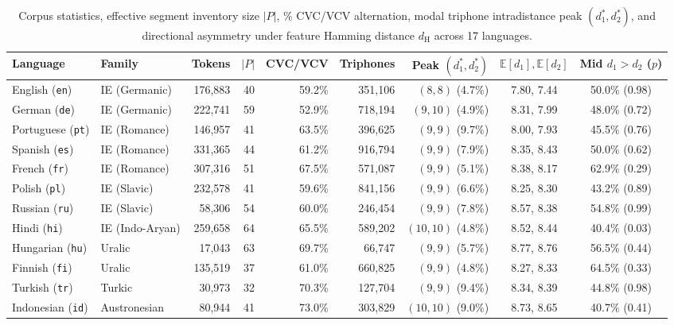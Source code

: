 \documentclass[11pt,a4paper,leqno]{article}
\begin{document}
\begin{table}[htbp]
\caption{Corpus statistics, effective segment inventory size $|P|$, \% CVC/VCV alternation, modal triphone intradistance peak $(d_1^*, d_2^*)$, and directional asymmetry under feature Hamming distance $d_{\text{H}}$ across 17 languages.}
\centering\footnotesize
\begin{tabular}{llrrrrrcc}
\toprule
Language & Family & Tokens & $|P|$ & CVC/VCV & Triphones & Peak $(d_1^*, d_2^*)$ & $\mathbb{E}[d_1], \mathbb{E}[d_2]$ & Mid $d_1>d_2$ ($p$) \\
\midrule
English (\texttt{en})    & IE (Germanic)    & 176,883 & 40 & 59.2\% & 351,106 & $(8,8)$ (4.7\%)   & 7.80, 7.44 & 50.0\% (0.98) \\
German (\texttt{de})     & IE (Germanic)    & 222,741 & 59 & 52.9\% & 718,194 & $(9,10)$ (4.9\%)  & 8.31, 7.99 & 48.0\% (0.72) \\
Portuguese (\texttt{pt}) & IE (Romance)     & 146,957 & 41 & 63.5\% & 396,625 & $(9,9)$ (9.7\%)   & 8.00, 7.93 & 45.5\% (0.76) \\
Spanish (\texttt{es})    & IE (Romance)     & 331,365 & 44 & 61.2\% & 916,794 & $(9,9)$ (7.9\%)   & 8.35, 8.43 & 50.0\% (0.62) \\
French (\texttt{fr})     & IE (Romance)     & 307,316 & 51 & 67.5\% & 571,087 & $(9,9)$ (5.1\%)   & 8.38, 8.17 & 62.9\% (0.29) \\
Polish (\texttt{pl})     & IE (Slavic)      & 232,578 & 41 & 59.6\% & 841,156 & $(9,9)$ (6.6\%)   & 8.25, 8.30 & 43.2\% (0.89) \\
Russian (\texttt{ru})    & IE (Slavic)      &  58,306 & 54 & 60.0\% & 246,454 & $(9,9)$ (7.8\%)   & 8.57, 8.38 & 54.8\% (0.99) \\
Hindi (\texttt{hi})      & IE (Indo-Aryan)  & 259,658 & 64 & 65.5\% & 589,202 & $(10,10)$ (4.8\%) & 8.52, 8.44 & 40.4\% (0.03) \\
Hungarian (\texttt{hu})  & Uralic           &  17,043 & 63 & 69.7\% &  66,747 & $(9,9)$ (5.7\%)   & 8.77, 8.76 & 56.5\% (0.44) \\
Finnish (\texttt{fi})    & Uralic           & 135,519 & 37 & 61.0\% & 660,825 & $(9,9)$ (4.8\%)   & 8.27, 8.33 & 64.5\% (0.33) \\
Turkish (\texttt{tr})    & Turkic           &  30,973 & 32 & 70.3\% & 127,704 & $(9,9)$ (9.4\%)   & 8.34, 8.39 & 44.8\% (0.98) \\
Indonesian (\texttt{id}) & Austronesian     &  80,944 & 41 & 73.0\% & 303,829 & $(10,10)$ (9.0\%) & 8.73, 8.65 & 40.7\% (0.41) \\

\end{tabular}
\end{table}
\end{document}
